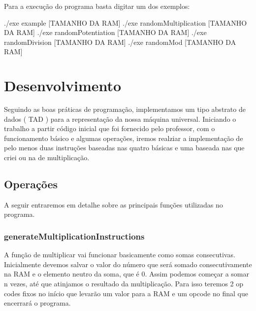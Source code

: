 \documentclass{article}
\begin{document}
Para a execução do programa basta digitar um dos exemplos:
\begin{tcolorbox}[title=,width=\linewidth]
    ./exe example [TAMANHO DA RAM] \newline
    ./exe randomMultiplication [TAMANHO DA RAM]\newline
    ./exe randomPotentiation [TAMANHO DA RAM]\newline
    ./exe randomDivision [TAMANHO DA RAM]\newline
    ./exe randomMod [TAMANHO DA RAM]\newline


\end{tcolorbox}


\clearpage



\section{Desenvolvimento}

Seguindo as boas práticas de programação, implementamos um tipo abstrato de dados ( TAD ) para a representação da nossa máquina universal. Iniciando o trabalho a partir código inicial que foi fornecido pelo professor, com o funcionamento básico e algumas operações,
iremos realziar a implementação de pelo menos duas instruções baseadas nas quatro básicas e uma baseada nas que criei ou na de multiplicação.


\subsection{Operações}

A seguir entraremos em detalhe sobre as principais funções utilizadas no programa.

\subsubsection{generateMultiplicationInstructions}

A função de multiplicar vai funcionar basicamente como somas consecutivas. Inicialmente devemos salvar o valor do número que será somado consecutivamente na RAM
e o elemento neutro da soma, que é 0. Assim podemos começar a somar n vezes, até que atinjamos o resultado da multiplicação.
Para isso teremos 2 op codes fixos no início que levarão um valor para a RAM e um opcode no final que encerrará o programa.
\end{document}
